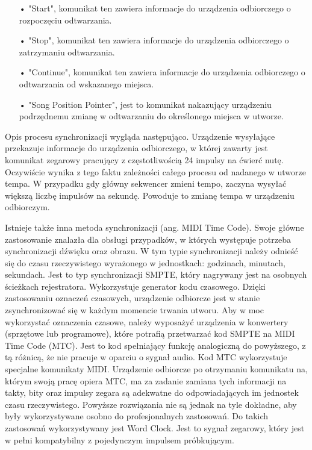 \begin{itemize}
\item[•]{"Start", komunikat ten zawiera informacje do urządzenia odbiorczego o rozpoczęciu odtwarzania.}
\item[•]{"Stop", komunikat ten zawiera informacje do urządzenia odbiorczego o zatrzymaniu odtwarzania.}
\item[•]{"Continue", komunikat ten zawiera informacje do urządzenia odbiorczego o odtwarzania od wskazanego miejsca.}
\item[•]{"Song Position Pointer", jest to komunikat nakazujący urządzeniu podrzędnemu zmianę w odtwarzaniu do określonego miejsca w utworze.}
\end{itemize}

Opis procesu synchronizacji wygląda następująco. Urządzenie wysyłające przekazuje informacje do urządzenia odbiorczego, w której zawarty jest komunikat zegarowy pracujący z częstotliwością 24 impulsy na ćwierć nutę. Oczywiście wynika z tego faktu zależności całego procesu od nadanego w utworze tempa. W przypadku gdy główny sekwencer zmieni tempo, zaczyna wysyłać większą liczbę impulsów na sekundę. Powoduje to zmianę tempa w urządzeniu odbiorczym.


Istnieje także inna metoda synchronizacji (ang. MIDI Time Code). Swoje główne zastosowanie znalazła dla obsługi przypadków, w których występuje potrzeba synchronizacji dźwięku oraz obrazu.  W tym typie synchronizacji należy odnieść się do czasu rzeczywistego wyrażonego w jednostkach: godzinach, minutach, sekundach. Jest to typ synchronizacji SMPTE, który nagrywany jest na osobnych ścieżkach rejestratora. Wykorzystuje generator kodu czasowego. Dzięki zastosowaniu oznaczeń czasowych, urządzenie odbiorcze jest w stanie zsynchronizować się w każdym momencie trwania utworu. Aby w moc wykorzystać oznaczenia czasowe, należy wyposażyć urządzenia w konwertery (sprzętowe lub programowe), które potrafią przetwarzać kod SMPTE na MIDI Time Code (MTC). Jest to kod spełniający funkcję analogiczną do powyższego, z tą różnicą, że nie pracuje w oparciu o sygnał audio. Kod MTC wykorzystuje specjalne komunikaty MIDI. Urządzenie odbiorcze po otrzymaniu komunikatu na, którym swoją pracę opiera MTC, ma za zadanie zamiana tych informacji na takty, bity oraz impulsy zegara są adekwatne do odpowiadających im jednostek czasu rzeczywistego. Powyższe rozwiązania nie są jednak na tyle dokładne, aby były wykorzystywane osobno do profesjonalnych zastosowań. Do takich zastosowań wykorzystywany jest Word Clock. Jest to sygnał zegarowy, który jest w pełni kompatybilny z pojedynczym impulsem próbkującym. 



